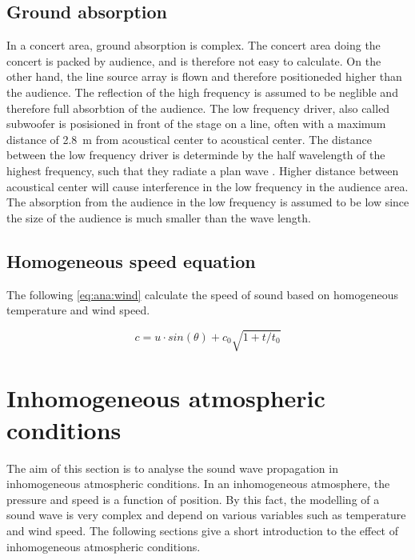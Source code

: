 \subsection{Ground absorption} 
In a concert area, ground absorption is complex. The concert area doing the concert is packed by audience, and is therefore not easy to calculate. On the other hand, the line source array is flown and therefore positioneded higher than the audience. The reflection of the high frequency is assumed to be neglible and therefore full absorbtion of the audience. The low frequency driver, also called subwoofer is posisioned in front of the stage on a line, often with a maximum distance of \SI{2.8}{\meter} from acoustical center to acoustical center. The distance between the low frequency driver is determinde by the half wavelength of the highest frequency, such that they radiate a plan wave \citep{bauman2001wavefront}. Higher distance between acoustical center will cause interference in the low frequency in the audience area. The absorption from the audience in the low frequency is assumed to be low since the size of the audience is much smaller than the wave length.   


 
 \subsection{Homogeneous speed equation}\label{sec:ana:inhom_ats_con}
 The following \autoref{eq:ana:wind} calculate the speed of sound based on homogeneous temperature and wind speed.

\begin{equation}\label{eq:ana:wind}
c = u \cdot sin(\theta) + c_0 \sqrt{1+t/t_0}
\end{equation}  

\startexplain
{}
\stopexplain


 
\section{Inhomogeneous atmospheric conditions} 
The aim of this section is to analyse the sound wave propagation in inhomogeneous atmospheric conditions. In an inhomogeneous atmosphere, the pressure and speed is a function of position. By this fact, the modelling of a sound wave is very complex and depend on various variables such as temperature and wind speed. The following sections give a short introduction to the effect of inhomogeneous atmospheric conditions. 
 
